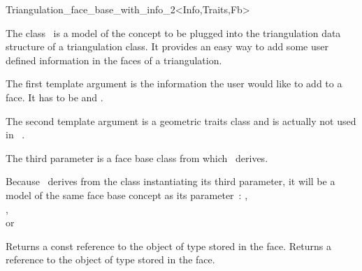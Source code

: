 

\begin{ccRefClass}{Triangulation_face_base_with_info_2<Info,Traits,Fb>} 



\ccDefinition
  
The class \ccRefName\ is a model of the concept
 to be plugged into the
triangulation data structure of a triangulation class.
It provides an easy way to add some user defined information
in the faces of a triangulation.


\ccParameters

The first template argument is the information the user would like to add
to a face.  It has to be  and .

The second template argument is a geometric traits class
and  is actually not used in \ccRefName\ .

The third parameter is a face base class from which
\ccRefName\ derives. 

\ccInheritsFrom {}

\ccIsModel
Because \ccRefName\ derives from the class instantiating its third
parameter, it will be a model of the same face base concept
as its parameter~:
,\\
 ,\\
or 


\ccTypes
{}


\ccAccessFunctions
{}
\ccTagFullDeclarations

{Returns a const reference to the object of type  stored in the face.}
\ccGlue
{}
{Returns a reference to the object of type  stored in the face.}

\ccSeeAlso
{} \\
 \\


\end{ccRefClass}


